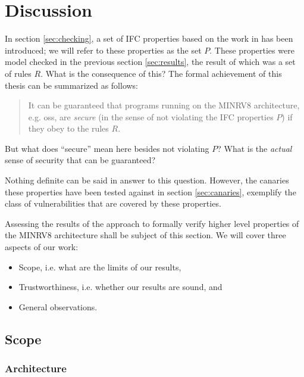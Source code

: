 
\section{Discussion}
\label{sec:discussion}

In section \ref{sec:checking}, a set of IFC properties based on the work in \cite{Ferraiuolo17} has been introduced; we will refer to these properties as the set $ P $.
These properties were model checked in the previous section \ref{sec:results}, the result of which was a set of rules $ R $.
What is the consequence of this?
The formal achievement of this thesis can be summarized as follows:
\begin{quote}
    It can be guaranteed that programs running on the MINRV8 architecture, e.g. \glspl{os}, are \textit{secure} (in the sense of not violating the IFC properties $ P $) if they obey to the rules $ R $.
\end{quote}
But what does \enquote{secure} mean here besides not violating $ P $?
What is the \textit{actual} sense of security that can be guaranteed?

Nothing definite can be said in answer to this question.
However, the canaries these properties have been tested against in section \ref{sec:canaries}, exemplify the class of vulnerabilities that are covered by these properties.

Assessing the results of the approach to formally verify higher level properties of the MINRV8 architecture shall be subject of this section.
We will cover three aspects of our work:
\begin{itemize}
    \item Scope, i.e. what are the limits of our results,
    \item Trustworthiness, i.e. whether our results are sound, and
    \item General observations.
\end{itemize}

\subsection{Scope}
\label{sec:scope}

\subsubsection{Architecture}


